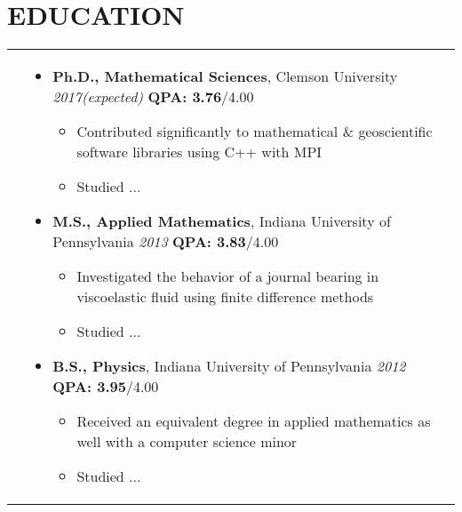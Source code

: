 \documentclass[10pt]{article}
\begin{document}
\section{\textbf{EDUCATION}}
\vspace*{-\baselineskip}
\hskip-1.7in
\begin{tabularx}{1.5\linewidth}{>{\raggedleft\scshape}p{3cm}X}
  &\begin{itemize}
    \setlength\itemsep{.005em}
  \item \textbf{Ph.D., Mathematical Sciences}, Clemson University  \hspace{18 mm} \textit{2017(expected)}\hspace{2mm} \textbf{QPA: 3.76}/4.00
  \vspace{-2mm}
   \begin{itemize}
       \setlength\itemsep{.005em}
   \item Contributed significantly to mathematical \& geoscientific software libraries using C++ with MPI
   
   \item Studied ...  
   \end{itemize}  
                        
             
\item \textbf{M.S., Applied Mathematics}, Indiana University of Pennsylvania  \hspace{12 mm} \textit{2013} \hspace{2mm} \textbf{QPA: 3.83}/4.00
    \vspace{-2mm}
     \begin{itemize}
         \setlength\itemsep{.005em}
   \item Investigated the behavior of a journal bearing in viscoelastic fluid using finite difference methods
   
   \item Studied ...
   \end{itemize}  
             
\item \textbf{B.S., Physics}, Indiana University of Pennsylvania  \hspace{39 mm}\textit{2012} \hspace{2 mm} \textbf{QPA: 3.95}/4.00
    \vspace{-2mm}
     \begin{itemize}
         \setlength\itemsep{.005em}
   \item Received an equivalent degree in applied mathematics as well with a computer science minor
   
   \item Studied ...
   \end{itemize}  
          
  \end{itemize} 

\end{tabularx}
\end{document}
